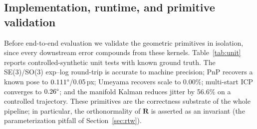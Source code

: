 \documentclass[9pt,twoside,web]{ieeecolor2}
\begin{document}
\begin{table}[t]
\centering
\caption{Evaluation resources and their roles.}
\label{tab:datasets}
\setlength{\tabcolsep}{4pt}\small
{}
\end{table}

\subsection{Implementation, runtime, and primitive validation}
Before end-to-end evaluation we validate the geometric primitives in isolation, since every downstream error compounds from these kernels. Table~\ref{tab:unit} reports controlled-synthetic unit tests with known ground truth. The SE(3)/SO(3) exp--log round-trip is accurate to machine precision; PnP recovers a known pose to $0.111\degree$/0.05\,px; Umeyama recovers scale to 0.00\%; multi-start ICP converges to $0.26\degree$; and the manifold Kalman reduces jitter by 56.6\% on a controlled trajectory. These primitives are the correctness substrate of the whole pipeline; in particular, the orthonormality of $\mathbf{R}$ is asserted as an invariant (the parameterization pitfall of Section~\ref{sec:rtw}).
\end{document}
